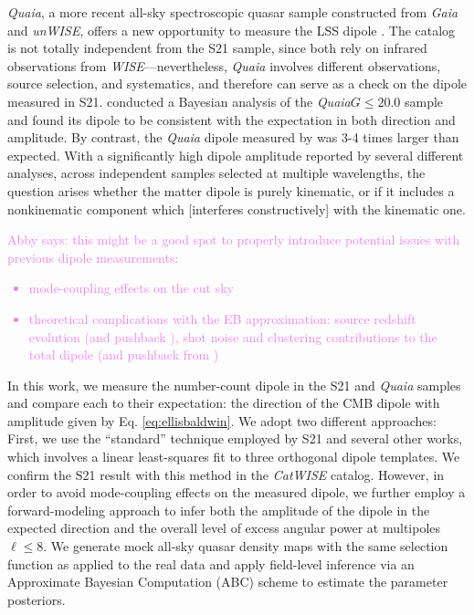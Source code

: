 \documentclass[modern]{aastex631}
\newcommand{\abby}[1]{\textcolor{violet}{Abby says: #1}}
\newcommand{\catwise}{\textsl{CatWISE}\xspace}
\newcommand{\quaia}{\textsl{Quaia}\xspace}
\newcommand{\gaia}{\textsl{Gaia}\xspace}
\newcommand{\unwise}{\textsl{unWISE}\xspace}
\begin{document}
\quaia, a more recent all-sky spectroscopic quasar sample constructed from \gaia and \unwise, offers a new opportunity to measure the LSS dipole \citep{storey-fisher_quaia_2023}.
The catalog is not totally independent from the S21 sample, since both rely on infrared observations from \textit{WISE}—nevertheless, \quaia involves different observations, source selection, and systematics, and therefore can serve as a check on the dipole measured in S21.
\citet{mittal_cosmic_2023} conducted a Bayesian analysis of the \quaia $G\le20.0$ sample and found its dipole to be consistent with the expectation in both direction and amplitude.
By contrast, the \quaia dipole measured by \citet{singal_cosmic_2024} was 3-4 times larger than expected.
With a significantly high dipole amplitude reported by several different analyses, across independent samples selected at multiple wavelengths, the question arises whether the matter dipole is purely kinematic, or if it includes a nonkinematic component which [interferes constructively] with the kinematic one.

\abby{this might be a good spot to properly introduce potential issues with previous dipole measurements:
\begin{itemize}
    \item mode-coupling effects on the cut sky \citep{abghari_reassessment_2024, oayda_cosmic_2024}
    \item theoretical complications with the EB approximation: source redshift evolution \citep{dalang_kinematic_2022, guandalin_theoretical_2022} (and pushback \citep{von_hausegger_expected_2024}), shot noise and clustering contributions to the total dipole \citep{cheng_is_2023} (and pushback from \citep{singal_cosmic_2024})
\end{itemize}}

In this work, we measure the number-count dipole in the S21 and \quaia samples and compare each to their expectation: the direction of the CMB dipole with amplitude given by Eq. \ref{eq:ellisbaldwin}.
We adopt two different approaches:
First, we use the ``standard'' technique employed by S21 and several other works, which involves a linear least-squares fit to three orthogonal dipole templates.
We confirm the S21 result with this method in the \catwise catalog.
However, in order to avoid mode-coupling effects on the measured dipole, we further employ a forward-modeling approach to infer both the amplitude of the dipole in the expected direction and the overall level of excess angular power at multipoles $\ell\le 8$.
We generate mock all-sky quasar density maps with the same selection function as applied to the real data and apply field-level inference via an Approximate Bayesian Computation (ABC) scheme to estimate the parameter posteriors.
\end{document}
